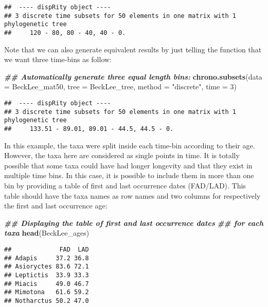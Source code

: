 \documentclass[
]{book}
\newenvironment{Shaded}{\begin{snugshade}}{\end{snugshade}}
\newcommand{\AttributeTok}[1]{\textcolor[rgb]{0.13,0.29,0.53}{#1}}
\newcommand{\DecValTok}[1]{\textcolor[rgb]{0.00,0.00,0.81}{#1}}
\newcommand{\DocumentationTok}[1]{\textcolor[rgb]{0.56,0.35,0.01}{\textbf{\textit{#1}}}}
\newcommand{\FunctionTok}[1]{\textcolor[rgb]{0.13,0.29,0.53}{\textbf{#1}}}
\newcommand{\NormalTok}[1]{#1}
\newcommand{\StringTok}[1]{\textcolor[rgb]{0.31,0.60,0.02}{#1}}
\begin{document}
\begin{verbatim}
##  ---- dispRity object ---- 
## 3 discrete time subsets for 50 elements in one matrix with 1 phylogenetic tree
##     120 - 80, 80 - 40, 40 - 0.
\end{verbatim}

Note that we can also generate equivalent results by just telling the function that we want three time-bins as follow:

\begin{Shaded}
\begin{Highlighting}[]
\DocumentationTok{\#\# Automatically generate three equal length bins:}
\FunctionTok{chrono.subsets}\NormalTok{(}\AttributeTok{data =}\NormalTok{ BeckLee\_mat50, }\AttributeTok{tree =}\NormalTok{ BeckLee\_tree,}
               \AttributeTok{method =} \StringTok{"discrete"}\NormalTok{,}
               \AttributeTok{time =} \DecValTok{3}\NormalTok{)}
\end{Highlighting}
\end{Shaded}

\begin{verbatim}
##  ---- dispRity object ---- 
## 3 discrete time subsets for 50 elements in one matrix with 1 phylogenetic tree
##     133.51 - 89.01, 89.01 - 44.5, 44.5 - 0.
\end{verbatim}

In this example, the taxa were split inside each time-bin according to their age.
However, the taxa here are considered as single points in time.
It is totally possible that some taxa could have had longer longevity and that they exist in multiple time bins.
In this case, it is possible to include them in more than one bin by providing a table of first and last occurrence dates (FAD/LAD).
This table should have the taxa names as row names and two columns for respectively the first and last occurrence age:

\begin{Shaded}
\begin{Highlighting}[]
\DocumentationTok{\#\# Displaying the table of first and last occurrence dates}
\DocumentationTok{\#\# for each taxa}
\FunctionTok{head}\NormalTok{(BeckLee\_ages)}
\end{Highlighting}
\end{Shaded}

\begin{verbatim}
##             FAD  LAD
## Adapis     37.2 36.8
## Asioryctes 83.6 72.1
## Leptictis  33.9 33.3
## Miacis     49.0 46.7
## Mimotona   61.6 59.2
## Notharctus 50.2 47.0
\end{verbatim}
\end{document}
